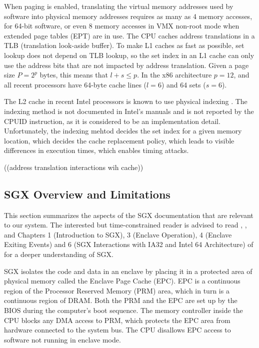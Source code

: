 When paging is enabled, translating the virtual memory addresses used by
software into physical memory addresses requires as many as 4 memory accesses,
for 64-bit software, or even 8 memory accesses in VMX non-root mode when
extended page tables (EPT) are in use. The CPU caches address translations in a
TLB (translation look-aside buffer). To make L1 caches as fast as possible, set
lookup does not depend on TLB lookup, so the set index in an L1 cache can only
use the address bits that are not impacted by address translation. Given a page
size $P = 2^{p}$ bytes, this means that $l + s \le p$. In the x86 architecture
$p = 12$, and all recent processors have 64-byte cache lines ($l = 6$) and
64 sets ($s = 6$).

The L2 cache in recent Intel processors is known to use physical indexing
\cite{patterson2013architecture}. The indexing method is not documented in
Intel's manuals and is not reported by the CPUID instruction, as it is
considered to be an implementation detail. Unfortunately, the indexing mehtod
decides the set index for a given memory location, which decides the cache
replacement policy, which leads to visible differences in execution times,
which enables timing attacks.

((address translation interactions wih cache))


\subsection{SGX Overview and Limitations}

This section summarizes the aspects of the SGX documentation that are relevant
to our system. The interested but time-constrained reader is advised to read
\cite{mckeen2013innovative}, \cite{anati2013sgx}, and Chapters 1 (Introduction
to SGX), 3 (Enclave Operation), 4 (Enclave Exiting Events) and 6 (SGX
Interactions with IA32 and Intel 64 Architecture) of \cite{intel2013sgxmanual}
for a deeper understanding of SGX.

SGX isolates the code and data in an enclave by placing it in a protected area
of physical memory called the Enclave Page Cache (EPC). EPC is a continuous
region of the Processor Reserved Memory (PRM) area, which in turn is a
continuous region of DRAM. Both the PRM and the EPC are set up by the BIOS
during the computer's boot sequence. The memory controller inside the CPU
blocks any DMA access to PRM, which protects the EPC area from hardware
connected to the system bus. The CPU disallows EPC access to software not
running in enclave mode.

